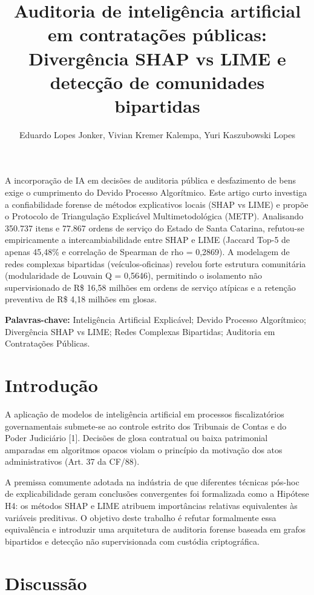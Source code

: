 \documentclass[12pt,a4paper]{article}
\title{\textbf{Auditoria de inteligência artificial em contratações públicas: Divergência SHAP vs LIME e detecção de comunidades bipartidas}}
\author{Eduardo Lopes Jonker\inst{1}, Vivian Kremer Kalempa\inst{1}, Yuri Kaszubowski Lopes\inst{1}}
\begin{document}
\maketitle

\begin{resumo}
A incorporação de IA em decisões de auditoria pública e desfazimento de bens exige o cumprimento do Devido Processo Algorítmico. Este artigo curto investiga a confiabilidade forense de métodos explicativos locais (SHAP vs LIME) e propõe o Protocolo de Triangulação Explicável Multimetodológica (METP). Analisando 350.737 itens e 77.867 ordens de serviço do Estado de Santa Catarina, refutou-se empiricamente a intercambiabilidade entre SHAP e LIME (Jaccard Top-5 de apenas 45,48\% e correlação de Spearman de rho = 0,2869). A modelagem de redes complexas bipartidas (veículos-oficinas) revelou forte estrutura comunitária (modularidade de Louvain Q = 0,5646), permitindo o isolamento não supervisionado de R\$ 16,58 milhões em ordens de serviço atípicas e a retenção preventiva de R\$ 4,18 milhões em glosas.

\vspace{0.2cm}
\noindent\textbf{Palavras-chave:} Inteligência Artificial Explicável; Devido Processo Algorítmico; Divergência SHAP vs LIME; Redes Complexas Bipartidas; Auditoria em Contratações Públicas.
\end{resumo}



\section{Introdução}

A aplicação de modelos de inteligência artificial em processos fiscalizatórios governamentais submete-se ao controle estrito dos Tribunais de Contas e do Poder Judiciário [1]. Decisões de glosa contratual ou baixa patrimonial amparadas em algoritmos opacos violam o princípio da motivação dos atos administrativos (Art. 37 da CF/88).

A premissa comumente adotada na indústria de que diferentes técnicas pós-hoc de explicabilidade geram conclusões convergentes foi formalizada como a Hipótese H4: os métodos SHAP e LIME atribuem importâncias relativas equivalentes às variáveis preditivas. O objetivo deste trabalho é refutar formalmente essa equivalência e introduzir uma arquitetura de auditoria forense baseada em grafos bipartidos e detecção não supervisionada com custódia criptográfica.


\section{Discussão}
\end{document}
